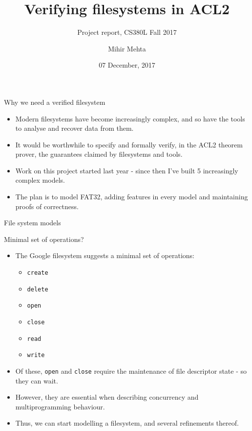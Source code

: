 \documentclass{beamer}
\title{Verifying filesystems in ACL2}
\subtitle{Project report, CS380L Fall 2017}
\author{Mihir Mehta}
\institute{
  Department of Computer Science\\
  University of Texas at Austin\\[1ex]
  \texttt{mihir@cs.utexas.edu}
}
\date{07 December, 2017}
\begin{document}
\begin{frame}[plain]
  \titlepage
\end{frame}


\begin{frame}{Why we need a verified filesystem}
  \begin{itemize}
  \item Modern filesystems have become increasingly complex, and so
    have the tools to analyse and recover data from them.
  \item It would be worthwhile to specify and formally verify, in the
    ACL2 theorem prover, the guarantees claimed by filesystems and
    tools.
  \item Work on this project started last year - since then I've built
    5 increasingly complex models.
  \item The plan is to model FAT32, adding features in every model and
    maintaining proofs of correctness.
  \end{itemize}
\end{frame}

\begin{frame}{File system models}
\end{frame}

\begin{frame}{Minimal set of operations?}
  \begin{itemize}
  \item The Google filesystem suggests a minimal set of operations:
    \begin{itemize}
    \item \texttt{create}
    \item \texttt{delete}
    \item \texttt{open}
    \item \texttt{close}
    \item \texttt{read}
    \item \texttt{write}
    \end{itemize}
  \item Of these, \texttt{open} and \texttt{close} require the
    maintenance of file descriptor state - so they can wait.
  \item However, they are essential when describing concurrency and
    multiprogramming behaviour.
  \item Thus, we can start modelling a filesystem, and several
    refinements thereof.
  \end{itemize}
\end{frame}
\end{document}
